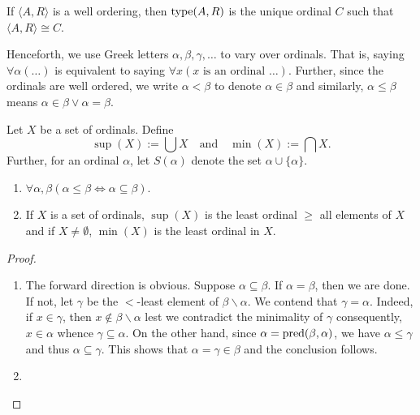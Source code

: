 \begin{definition}
    If $\langle A, R\rangle$ is a well ordering, then $\operatorname{type}(A,R)$ is the unique ordinal $C$ such that $\langle A, R\rangle\cong C$.
\end{definition}

Henceforth, we use Greek letters $\alpha,\beta,\gamma,\dots$ to vary over ordinals. That is, saying $\forall\alpha(\dots)$ is equivalent to saying $\forall x(x\text{ is an ordinal }\dots)$. Further, since the ordinals are well ordered, we write $\alpha < \beta$ to denote $\alpha\in\beta$ and similarly, $\alpha\le\beta$ means $\alpha\in\beta\vee\alpha = \beta$.

\begin{definition}
    Let $X$ be a set of ordinals. Define 
    \begin{equation*}
        \sup(X) := \bigcup X\quad\text{and}\quad\min(X) := \bigcap X.
    \end{equation*}
    Further, for an ordinal $\alpha$, let $S(\alpha)$ denote the set $\alpha\cup\{\alpha\}$.
\end{definition}

\begin{lemma}
\begin{enumerate}[label=(\alph*)]
    \item $\forall\alpha,\beta(\alpha\le\beta\iff\alpha\subseteq\beta)$.
    \item If $X$ is a set of ordinals, $\sup(X)$ is the least ordinal $\ge$ all elements of $X$ and if $X\ne\emptyset$, $\min(X)$ is the least ordinal in $X$.
\end{enumerate}
\end{lemma}
\begin{proof}
\begin{enumerate}[label=(\alph*)]
    \item The forward direction is obvious. Suppose $\alpha\subseteq\beta$. If $\alpha = \beta$, then we are done. If not, let $\gamma$ be the $<$-least element of $\beta\backslash\alpha$. We contend that $\gamma = \alpha$. Indeed, if $x\in\gamma$, then $x\notin\beta\backslash\alpha$ lest we contradict the minimality of $\gamma$ consequently, $x\in\alpha$ whence $\gamma\subseteq\alpha$. On the other hand, since $\alpha = \operatorname{pred}(\beta,\alpha)$, we have $\alpha\le\gamma$ and thus $\alpha\subseteq\gamma$. This shows that $\alpha = \gamma\in\beta$ and the conclusion follows.

    \item \qedhere
\end{enumerate}
\end{proof}

